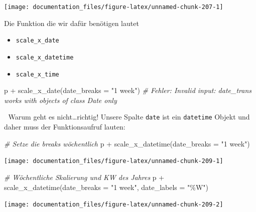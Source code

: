 \documentclass[
]{article}
\newenvironment{Shaded}{\begin{snugshade}}{\end{snugshade}}
\newcommand{\AttributeTok}[1]{\textcolor[rgb]{0.77,0.63,0.00}{#1}}
\newcommand{\CommentTok}[1]{\textcolor[rgb]{0.56,0.35,0.01}{\textit{#1}}}
\newcommand{\FunctionTok}[1]{\textcolor[rgb]{0.00,0.00,0.00}{#1}}
\newcommand{\NormalTok}[1]{#1}
\newcommand{\SpecialCharTok}[1]{\textcolor[rgb]{0.00,0.00,0.00}{#1}}
\newcommand{\StringTok}[1]{\textcolor[rgb]{0.31,0.60,0.02}{#1}}
\providecommand{\tightlist}{%
  \setlength{\itemsep}{0pt}\setlength{\parskip}{0pt}}
\begin{document}
\begin{center}\texttt{[image: documentation\_files/figure-latex/unnamed-chunk-207-1]} \end{center}

Die Funktion die wir dafür benötigen lautet

\begin{itemize}
\tightlist
\item
  \texttt{scale\_x\_date}
\item
  \texttt{scale\_x\_datetime}
\item
  \texttt{scale\_x\_time}
\end{itemize}

\begin{Shaded}
\begin{Highlighting}[]
\NormalTok{p }\SpecialCharTok{+} \FunctionTok{scale\_x\_date}\NormalTok{(}\AttributeTok{date\_breaks =} \StringTok{"1 week"}\NormalTok{)}
\CommentTok{\# Fehler: Invalid input: date\_trans works with objects of class Date only}
\end{Highlighting}
\end{Shaded}

🤯 Warum geht es nicht\ldots richtig! Unsere Spalte \texttt{date} ist ein \texttt{datetime} Objekt und daher muss der Funktionsaufruf lauten:

\begin{Shaded}
\begin{Highlighting}[]
\CommentTok{\# Setze die breaks wöchentlich}
\NormalTok{p }\SpecialCharTok{+} \FunctionTok{scale\_x\_datetime}\NormalTok{(}\AttributeTok{date\_breaks =} \StringTok{"1 week"}\NormalTok{)}
\end{Highlighting}
\end{Shaded}

\begin{center}\texttt{[image: documentation\_files/figure-latex/unnamed-chunk-209-1]} \end{center}

\begin{Shaded}
\begin{Highlighting}[]
\CommentTok{\# Wöchentliche Skalierung und KW des Jahres}
\NormalTok{p }\SpecialCharTok{+} \FunctionTok{scale\_x\_datetime}\NormalTok{(}\AttributeTok{date\_breaks =} \StringTok{"1 week"}\NormalTok{, }\AttributeTok{date\_labels =} \StringTok{"\%W"}\NormalTok{)}
\end{Highlighting}
\end{Shaded}

\begin{center}\texttt{[image: documentation\_files/figure-latex/unnamed-chunk-209-2]} \end{center}
\end{document}

